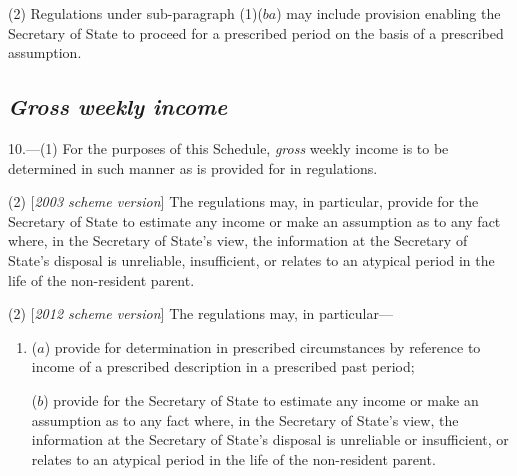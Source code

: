 \documentclass[12pt,a4paper]{article}
\begin{document}
(2) Regulations under sub-paragraph (1)($ba$) may include provision enabling the 
Secretary of State
to proceed for a prescribed period on the basis of a prescribed assumption. 


\subsection*{\itshape 
\emph{Gross}  %
 weekly income}

10.---(1) For the purposes of this Schedule, 
\emph{gross}  %
weekly income is to be determined in such manner as is provided for in regulations.

(2) [\emph{2003 scheme version}] The regulations may, in particular, provide for the 
Secretary of State  %
to estimate any income or make an assumption as to any fact where, in 
the Secretary of State's %
view, the information at 
the Secretary of State's  %
disposal is unreliable, insufficient, or relates to an atypical period in the life of the non-resident parent.

(2) [\emph{2012 scheme version}] The regulations may, in particular—
\begin{enumerate}\item[]
($a$) provide for determination in prescribed circumstances by reference to income of a prescribed description in a prescribed past period;

($b$) provide for the Secretary of State to estimate any income or make an assumption as to any fact where, in the Secretary of State's view, the information at the Secretary of State's disposal is unreliable or insufficient, or relates to an atypical period in the life of the non-resident parent.
\end{enumerate}
\end{document}

